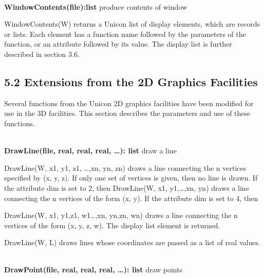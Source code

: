 \documentclass[letterpaper]{article}
\begin{document}
{\noindent\hrulefill\\
\noindent\textsf{\textbf{WindowContents(file):list}}
\hfill produce contents of window


\bigskip

\textsf{WindowContents(W)} returns a Unicon list of display elements,
which are records or lists. Each element has a function name followed
by the parameters of the function, or an attribute followed by its
value. The display list is further described in section 3.6.

\bigskip

\bigskip

\subsection[5.2 Extensions from the 2D Graphics Facilities]
{5.2 Extensions from the 2D Graphics Facilities}


\bigskip

Several functions from the Unicon 2D graphics facilities have been
modified for use in the 3D facilities. This section describes the
parameters and use of these functions.

\bigskip

\bigskip

\noindent\hrulefill\\
\noindent\textsf{\textbf{DrawLine(file, real, real, real, {\dots}): list}}
\hfill draw a line


\bigskip

\textsf{DrawLine(W, x1, y1, z1, {\dots},xn, yn, zn)} draws a line
connecting the n vertices specified by (x, y, z). If only one set of
vertices is given, then no line is drawn. If the attribute
\textsf{dim} is set to 2, then
\textsf{DrawLine(W, x1, y1,{\dots},xn, yn)}
draws a line connecting the n vertices of the form (x, y). If
the attribute \textsf{dim} is set to 4, then

\textsf{DrawLine(W, x1, y1,z1, w1{\dots},xn, yn,zn, wn)}
draws a line connecting the n vertices of the form (x, y, z, w).
The display list element is returned.


\bigskip

DrawLine(W, L) draws lines whose coordinates are passed as a list of
real values.

\noindent\hrulefill\\
\noindent\textsf{\textbf{DrawPoint(file, real, real, real, {\dots}): list}}
\hfill draw points


\bigskip

}
\end{document}

